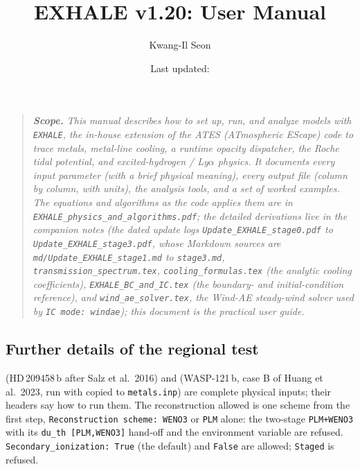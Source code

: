 \documentclass[english,a4paper]{my_memo}
\begin{document}
\title{EXHALE v1.20: User Manual}
\author{Kwang-Il Seon}
\date{Last updated: \docmoddate}
\maketitle

\begin{quote}\small\itshape
\textbf{Scope.} This manual describes how to set up, run, and analyze models with
\texttt{EXHALE}, the in-house extension of the ATES (ATmospheric EScape) code
to trace metals, metal-line cooling, a runtime opacity dispatcher, the Roche
tidal potential, and excited-hydrogen / Ly$\alpha$ physics. It documents every
input parameter (with a brief physical meaning), every output file (column by
column, with units), the analysis tools, and a set of worked examples. The
equations and algorithms as the code applies them are in
\texttt{EXHALE\_physics\_and\_algorithms.pdf}; the detailed derivations live in
the companion notes (the dated update logs
\texttt{Update\_EXHALE\_stage0.pdf} to \texttt{Update\_EXHALE\_stage3.pdf},
whose Markdown sources are \texttt{md/Update\_EXHALE\_stage1.md} to
\texttt{stage3.md}, \texttt{transmission\_spectrum.tex},
\texttt{cooling\_formulas.tex} (the analytic cooling coefficients),
\texttt{EXHALE\_BC\_and\_IC.tex} (the boundary- and
initial-condition reference), and \texttt{wind\_ae\_solver.tex}, the
Wind-AE steady-wind solver used by \texttt{IC mode: windae});
this document is the practical user guide.
\end{quote}

\tableofcontents


\subsection{Further details of the regional test}\label{sec:v110-regional-details}

 (HD\,209458\,b after Salz et
al.\ 2016) and  (WASP-121\,b,
case B of Huang et al.\ 2023, run with  copied to
\texttt{metals.inp}) are complete physical inputs; their headers say how to
run them. The reconstruction allowed is one scheme from the first step,
\texttt{Reconstruction scheme: WENO3} or \texttt{PLM} alone: the two-stage
\texttt{PLM+WENO3} with its \texttt{du\_th [PLM,WENO3]} hand-off and the
environment variable  are refused.
\texttt{Secondary\_ionization: True} (the default) and \texttt{False} are
allowed; \texttt{Staged} is refused.
\end{document}
